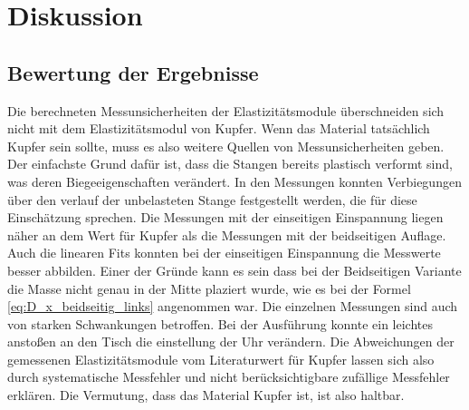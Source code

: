 
\section{Diskussion}


\subsection{Bewertung der Ergebnisse}
Die berechneten Messunsicherheiten der Elastizitätsmodule überschneiden sich nicht mit dem Elastizitätsmodul von Kupfer.
Wenn das Material tatsächlich Kupfer sein sollte, muss es also weitere Quellen von Messunsicherheiten geben.
Der einfachste Grund dafür ist, dass die Stangen bereits plastisch verformt sind,
was deren Biegeeigenschaften verändert.
In den Messungen konnten Verbiegungen über den verlauf der unbelasteten Stange festgestellt werden,
 die für diese Einschätzung sprechen.
Die Messungen mit der einseitigen Einspannung liegen näher an dem Wert für Kupfer als die Messungen 
 mit der beidseitigen Auflage.
Auch die linearen Fits konnten bei der einseitigen Einspannung die Messwerte besser abbilden.
Einer der Gründe kann es sein dass bei der Beidseitigen Variante die Masse nicht
genau in der Mitte plaziert wurde, wie es bei der Formel \eqref{eq:D_x_beidseitig_links} angenommen war.
Die einzelnen Messungen sind auch von starken Schwankungen betroffen.
Bei der Ausführung konnte ein leichtes anstoßen an den Tisch die einstellung der Uhr verändern.
Die Abweichungen der gemessenen Elastizitätsmodule vom Literaturwert für Kupfer lassen sich also durch
systematische Messfehler und nicht berücksichtigbare zufällige Messfehler erklären.
Die Vermutung, dass das Material Kupfer ist, ist also haltbar.

